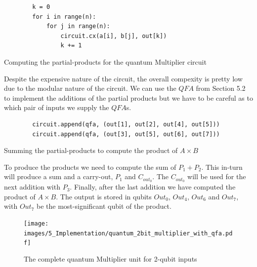 \begin{listing}[ht]
    \centering
    \begin{verbatim}
        k = 0
        for i in range(n):
            for j in range(n):
                circuit.cx(a[i], b[j], out[k])
                k += 1
    \end{verbatim}
    \caption{Computing the partial-products for the quantum Multiplier circuit}
\end{listing}

Despite the expensive nature of the circuit, the overall compexity is pretty low due to the modular
nature of the circuit. We can use the $QFA$ from Section 5.2 to implement the additions of the partial products
but we have to be careful as to which pair of inputs we supply the $QFA$s.

\begin{listing}[ht]
    \centering
    \begin{verbatim}
        circuit.append(qfa, (out[1], out[2], out[4], out[5]))
        circuit.append(qfa, (out[3], out[5], out[6], out[7]))
    \end{verbatim}
    \caption{Summing the partial-products to compute the product of $A\times B$}
\end{listing}

To produce the products we need to compute the sum of $P_1+P_2$. This in-turn will produce a sum and a carry-out,
$P_1$ and $C_{out_0}$. The $C_{out_0}$ will be used for the next addition with $P_3$. Finally, after the last
addition we have computed the product of $A \times B$. The output is stored in qubits $Out_0$, $Out_4$, $Out_6$ and
$Out_7$, with $Out_7$ be the most-significant qubit of the product.

\begin{figure}[ht]
    \centering
    \texttt{[image: images/5\_Implementation/quantum\_2bit\_multiplier\_with\_qfa.pdf]}
    \caption{The complete quantum Multiplier unit for 2-qubit inputs}
\end{figure}